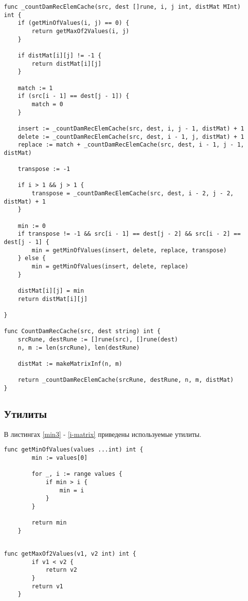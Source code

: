 \begin{lstlisting}[label=damer-lev-rec,caption=Программный код нахождения расстояния Дамерау -- Левенштейна рекурсивно с кэшем]	
func _countDamRecElemCache(src, dest []rune, i, j int, distMat MInt) int {
	if (getMinOfValues(i, j) == 0) {
		return getMaxOf2Values(i, j)
	}
	
	if distMat[i][j] != -1 {
		return distMat[i][j]
	}
	
	match := 1
	if (src[i - 1] == dest[j - 1]) {
		match = 0
	}
	
	insert := _countDamRecElemCache(src, dest, i, j - 1, distMat) + 1
	delete := _countDamRecElemCache(src, dest, i - 1, j, distMat) + 1
	replace := match + _countDamRecElemCache(src, dest, i - 1, j - 1, distMat)
	
	transpose := -1
	
	if i > 1 && j > 1 {
		transpose = _countDamRecElemCache(src, dest, i - 2, j - 2, distMat) + 1
	}
	
	min := 0
	if transpose != -1 && src[i - 1] == dest[j - 2] && src[i - 2] == dest[j - 1] {
		min = getMinOfValues(insert, delete, replace, transpose)
	} else {
		min = getMinOfValues(insert, delete, replace)
	}
	
	distMat[i][j] = min
	return distMat[i][j]
	
}

func CountDamRecCache(src, dest string) int {
	srcRune, destRune := []rune(src), []rune(dest)
	n, m := len(srcRune), len(destRune)
	
	distMat := makeMatrixInf(n, m)
	
	return _countDamRecElemCache(srcRune, destRune, n, m, distMat)
}
\end{lstlisting}

\subsection{Утилиты}
В листингах \ref{min3} - \ref{i-matrix} приведены используемые утилиты.
\begin{lstlisting}[label=min3,caption=Функция нахождения минимума из N целых чисел]
	func getMinOfValues(values ...int) int {
		min := values[0]
		
		for _, i := range values {
			if min > i {
				min = i
			}
		}
		
		return min
	}
	
\end{lstlisting}

\begin{lstlisting}[label=max2,caption=Функция нахождения максимума из двух целых чисел]
	func getMaxOf2Values(v1, v2 int) int {
		if v1 < v2 {
			return v2
		}
		return v1
	}
\end{lstlisting}


